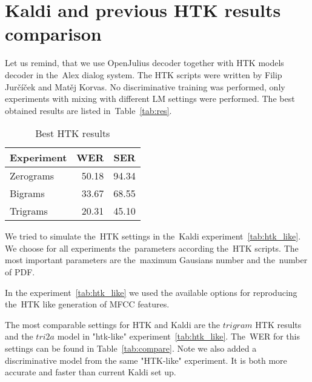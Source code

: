 {%

\section[Kaldi and \acs{HTK} comparison]{Kaldi and previous \ac{HTK} results comparison} 
\label{sec:compare}

Let us remind, that we use OpenJulius decoder together with HTK models decoder in the~Alex dialog system.
The \ac{HTK} scripts were written by Filip Jurčíček and Matěj Korvas. No discriminative training was performed,
only experiments with mixing with different \acl{LM} settings were performed. 
The best obtained results are listed in~Table~\ref{tab:res}.

\begin{table}[!htp]\label{tab:htk_res}\centering\begin{tabular}{l|rr}
Experiment      & \ac{WER} & \ac{SER} \\
\hline
    Zerograms      & 50.18  & 94.34  \\
    Bigrams        & 33.67  & 68.55  \\
    Trigrams       & 20.31  & 45.10  \\
\end{tabular}
\caption{Best \ac{HTK} results}
\end{table}  


We tried to simulate the~\ac{HTK} settings in the~Kaldi experiment~\ref{tab:htk_like}.
We choose for all experiments the~parameters according the~\ac{HTK} scripts.
The most important parameters are the~maximum Gausians number and the~number of \acl{PDF}.

In the experiment~\ref{tab:htk_like} we used the available options for reproducing the~\ac{HTK} like generation
of \ac{MFCC} features.

The most comparable settings for \ac{HTK} and Kaldi are the $trigram$ \ac{HTK} results
and the $tri2a$ model in "htk-like" experiment~\ref{tab:htk_like}. 
The~\ac{WER} for this settings can be found in Table~\ref{tab:compare}.
Note we also added a discriminative model from the same "\ac{HTK}-like" experiment.
It is both more accurate and faster than current Kaldi set up.

}
